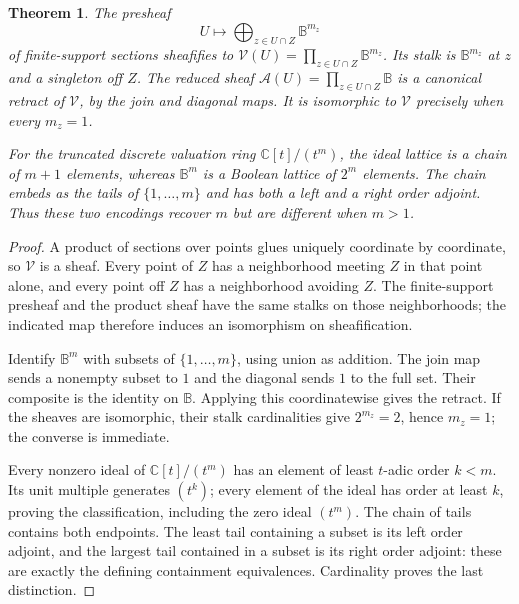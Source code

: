 \documentclass[11pt]{article}
\newcommand{\C}{\mathbb C}\newcommand{\B}{\mathbb B}
\newtheorem{theorem}{Theorem}[section]
\theoremstyle{definition}\newtheorem{definition}[theorem]{Definition}
\begin{document}
\begin{theorem}\label{thm:divisor}
The presheaf
\[
 U\longmapsto\bigoplus_{z\in U\cap Z}\B^{m_z}
\]
of finite-support sections sheafifies to $\mathcal V(U)=\prod_{z\in U\cap Z}\B^{m_z}$. Its stalk is $\B^{m_z}$ at $z$ and a singleton off $Z$. The reduced sheaf $\mathcal A(U)=\prod_{z\in U\cap Z}\B$ is a canonical retract of $\mathcal V$, by the join and diagonal maps. It is isomorphic to $\mathcal V$ precisely when every $m_z=1$.

For the truncated discrete valuation ring $\C[t]/(t^m)$, the ideal lattice is a chain of $m+1$ elements, whereas $\B^m$ is a Boolean lattice of $2^m$ elements. The chain embeds as the tails of $\{1,\ldots,m\}$ and has both a left and a right order adjoint. Thus these two encodings recover $m$ but are different when $m>1$.
\end{theorem}
\begin{proof}
A product of sections over points glues uniquely coordinate by coordinate, so $\mathcal V$ is a sheaf. Every point of $Z$ has a neighborhood meeting $Z$ in that point alone, and every point off $Z$ has a neighborhood avoiding $Z$. The finite-support presheaf and the product sheaf have the same stalks on those neighborhoods; the indicated map therefore induces an isomorphism on sheafification.

Identify $\B^m$ with subsets of $\{1,\ldots,m\}$, using union as addition. The join map sends a nonempty subset to $1$ and the diagonal sends $1$ to the full set. Their composite is the identity on $\B$. Applying this coordinatewise gives the retract. If the sheaves are isomorphic, their stalk cardinalities give $2^{m_z}=2$, hence $m_z=1$; the converse is immediate.

Every nonzero ideal of $\C[t]/(t^m)$ has an element of least $t$-adic order $k<m$. Its unit multiple generates $(t^k)$; every element of the ideal has order at least $k$, proving the classification, including the zero ideal $(t^m)$. The chain of tails contains both endpoints. The least tail containing a subset is its left order adjoint, and the largest tail contained in a subset is its right order adjoint: these are exactly the defining containment equivalences. Cardinality proves the last distinction.
\end{proof}
\end{document}
